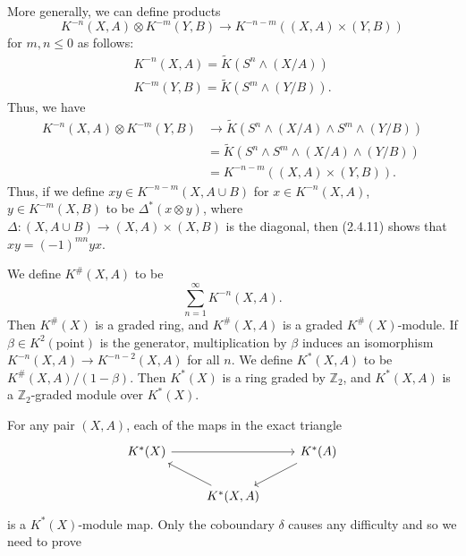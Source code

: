 \documentclass[leqno]{book}
\numberwithin{equation}{section}
\theoremstyle{definition}
\begin{document}
            More generally, we can define products
            \begin{equation*}
              K^{-n}(X,A)\otimes K^{-m}(Y,B)\rightarrow K^{-n-m}((X,A)\times (Y,B))
            \end{equation*}
            for $m,n \leq 0$ as follows:
            \begin{equation*}
              \begin{aligned}
              K^{-n}(X,A)=\tilde{K}(S^{n}\wedge (X/A)) \\
              K^{-m}(Y,B)=\tilde{K}(S^{m}\wedge (Y/B)).
              \end{aligned}
            \end{equation*}
            Thus, we have
            \begin{equation*}
              \begin{aligned}
              K^{-n}(X,A)\otimes K^{-m}(Y,B) &\to \tilde{K}(S^{n}\wedge (X/A)\wedge S^{m}\wedge (Y/B)) \\
              &= \tilde{K}(S^{n}\wedge S^{m}\wedge (X/A)\wedge (Y/B)) \\
              &= K^{-n-m}((X,A)\times (Y,B)).
              \end{aligned}
            \end{equation*}
            Thus, if we define $xy \in K^{-n-m}(X,A\cup B)$ for $x\in K^{-n}(X,A)$, $y \in K^{-m}(X,B)$ to be $\Delta^{*}(x\otimes y)$, where $\Delta:(X,A\cup B)\to (X,A)\times (X,B)$ is the diagonal, then (2.4.11) shows that $xy=(-1)^{mn}yx$.

            We define $K^{\#}(X,A)$ to be
            \begin{equation*}
              \sum_{n=1}^{\infty}K^{-n}(X,A).
            \end{equation*}
            Then $K^{\#}(X)$ is a graded ring, and $K^{\#}(X,A)$ is a graded $K^{\#}(X)$-module. If $\beta \in K^{2}(\text{point})$ is the generator, multiplication by $\beta$ induces an isomorphism $K^{-n}(X,A)\to K^{-n-2}(X,A)$ for all $n$. We define $K^{*}(X,A)$ to be $K^{\#}(X,A)/(1-\beta)$. Then $K^{*}(X)$ is a ring graded by $\mathbb{Z}_{2}$, and $K^{*}(X,A)$ is a $\mathbb{Z}_{2}$-graded module over $K^{*}(X)$.

            For any pair $(X,A)$, each of the maps in the exact triangle
            \begin{equation*}
              \begin{tikzcd}
                K^{*}(X)\arrow[rr] & & K^{*}(A)\arrow[ld] \\
                 & K^{*}(X,A)\arrow[lu] &
              \end{tikzcd}
            \end{equation*}
            is a $K^{*}(X)$-module map. Only the coboundary $\delta$ causes any difficulty and so we need to prove
\end{document}
